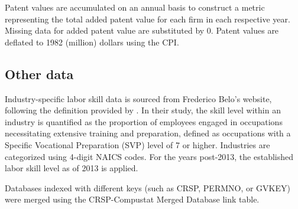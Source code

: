 \documentclass[12pt, letterpaper]{article}
\begin{document}
Patent values are accumulated on an annual basis to construct a metric representing the total added patent value for each firm in each respective year. Missing data for added patent value are substituted by 0. Patent values are deflated to 1982 (million) dollars using the CPI.

\subsection{Other data}

Industry-specific labor skill data is sourced from Frederico Belo's website, following the definition provided by \cite{Belo2017-qi}. In their study, the skill level within an industry is quantified as the proportion of employees engaged in occupations necessitating extensive training and preparation, defined as occupations with a Specific Vocational Preparation (SVP) level of 7 or higher. Industries are categorized using 4-digit NAICS codes. For the years post-2013, the established labor skill level as of 2013 is applied.

Databases indexed with different keys (such as CRSP, PERMNO, or GVKEY) were merged using the CRSP-Compustat Merged Database link table.
\end{document}
